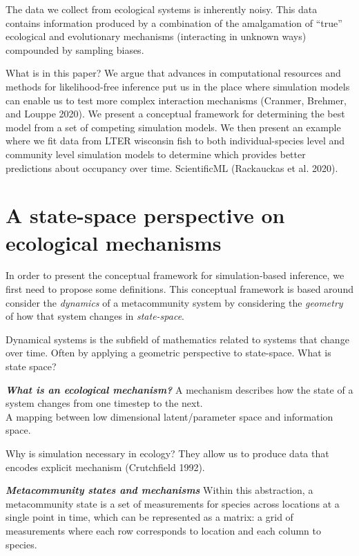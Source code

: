 \documentclass[10pt,oneside]{article}
\begin{document}
The data we collect from ecological systems is inherently noisy. This
data contains information produced by a combination of the amalgamation
of ``true'' ecological and evolutionary mechanisms (interacting in
unknown ways) compounded by sampling biases.

What is in this paper? We argue that advances in computational resources
and methods for likelihood-free inference put us in the place where
simulation models can enable us to test more complex interaction
mechanisms (Cranmer, Brehmer, and Louppe 2020). We present a conceptual
framework for determining the best model from a set of competing
simulation models. We then present an example where we fit data from
LTER wisconsin fish to both individual-species level and community level
simulation models to determine which provides better predictions about
occupancy over time. ScientificML (Rackauckas et al. 2020).

\hypertarget{a-state-space-perspective-on-ecological-mechanisms}{%
\section{A state-space perspective on ecological
mechanisms}\label{a-state-space-perspective-on-ecological-mechanisms}}

In order to present the conceptual framework for simulation-based
inference, we first need to propose some definitions. This conceptual
framework is based around consider the \emph{dynamics} of a
metacommunity system by considering the \emph{geometry} of how that
system changes in \emph{state-space}.

Dynamical systems is the subfield of mathematics related to systems that
change over time. Often by applying a geometric perspective to
state-space. What is state space?

\textbf{\emph{What is an ecological mechanism?}} A mechanism describes
how the state of a system changes from one timestep to the next.\\
A mapping between low dimensional latent/parameter space and information
space.

Why is simulation necessary in ecology? They allow us to produce data
that encodes explicit mechanism (Crutchfield 1992).

\textbf{\emph{Metacommunity states and mechanisms}} Within this
abstraction, a metacommunity state is a set of measurements for species
across locations at a single point in time, which can be represented as
a matrix: a grid of measurements where each row corresponds to location
and each column to species.
\end{document}

